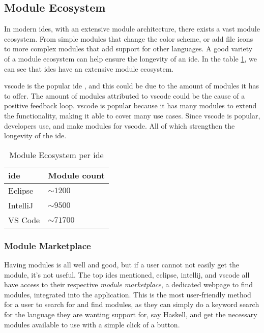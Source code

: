 \subsection{Module Ecosystem}

In modern \gls{ide}s, with an extensive module architecture, there exists a
vast module ecosystem. From simple modules that change the color scheme, or
add file icons to more complex modules that add support for other languages.
A good variety of a module ecosystem can help ensure the longevity of an
\gls{ide}. In the table \ref{tbl:mod}, we can see that \gls{ide}s have an
extensive module ecosystem. \footnotemark


\gls{vscode} is the popular \gls{ide} \cite{topIde}, and this could be due to
the amount of modules it has to offer. The amount of modules attributed to
\gls{vscode} could be the cause of a positive feedback loop. \gls{vscode} is
popular because it has many modules to extend the functionality, making it able
to cover many use cases. Since \gls{vscode} is popular, developers use, and make
modules for \gls{vscode}. All of which strengthen the longevity of the
\gls{ide}.

\begin{table}[]
  \centering
  \caption{Module Ecosystem per \gls{ide}}
  \label{tbl:mod}
  \begin{tabular}{|l|l|}
    \hline
    \gls{ide} & Module count \\ \hline
    Eclipse & $\sim1200$ \\ \hline
    IntelliJ & $\sim9500$ \\ \hline
    VS Code & $\sim71700$ \\ \hline
  \end{tabular}
\end{table}

\subsubsection{Module Marketplace}

Having modules is all well and good, but if a user cannot not easily get the
module, it's not useful. The top \gls{ide}s mentioned, \gls{eclipse},
\gls{intellij}, and \gls{vscode} all have access to their respective
\textit{module marketplace}, a dedicated webpage to find modules, integrated
into the application. This is the most user-friendly method for a user to search
for and find modules, as they can simply do a keyword search for the language
they are wanting support for, say Haskell, and get the necessary modules
available to use with a simple click of a button.

